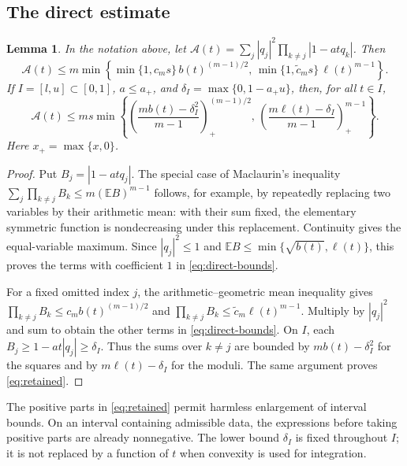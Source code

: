\documentclass[11pt,reqno]{amsart}
\newtheorem{lem}[thm]{Lemma}
\theoremstyle{definition}
\theoremstyle{remark}
\numberwithin{equation}{section}
\newcommand{\E}{\mathbb E}
\begin{document}
\subsection{The direct estimate}

\begin{lem}\label{lem:direct}
In the notation above, let
$\mathcal A(t)=\sum_j|q_j|^2\prod_{k\ne j}|1-atq_k|$.
Then
\begin{equation}\label{eq:direct-bounds}
 \mathcal A(t)\le m\min\left\{
 \min\{1,c_ms\}\,b(t)^{(m-1)/2},\,
 \min\{1,\widetilde c_ms\}\,\ell(t)^{m-1}
 \right\}.
\end{equation}
If $I=[l,u]\subset[0,1]$, $a\le a_+$, and $\delta_I=\max\{0,1-a_+u\}$, then, for all $t\in I$,
\begin{equation}\label{eq:retained}
 \mathcal A(t)\le ms\min\left\{
 \left(\frac{mb(t)-\delta_I^2}{m-1}\right)_{+}^{(m-1)/2},\,
 \left(\frac{m\ell(t)-\delta_I}{m-1}\right)_{+}^{m-1}
 \right\}.
\end{equation}
Here $x_+=\max\{x,0\}$.
\end{lem}
\begin{proof}
Put $B_j=|1-atq_j|$. The special case of Maclaurin's inequality
$\sum_j\prod_{k\ne j}B_k\le m(\E B)^{m-1}$ follows, for example, by repeatedly replacing two variables by their arithmetic mean: with their sum fixed, the elementary symmetric function is nondecreasing under this replacement. Continuity gives the equal-variable maximum. Since $|q_j|^2\le1$ and $\E B\le\min\{\sqrt{b(t)},\ell(t)\}$, this proves the terms with coefficient $1$ in \eqref{eq:direct-bounds}.

For a fixed omitted index $j$, the arithmetic--geometric mean inequality gives
$\prod_{k\ne j}B_k\le c_m b(t)^{(m-1)/2}$ and
$\prod_{k\ne j}B_k\le\widetilde c_m\ell(t)^{m-1}$.
Multiply by $|q_j|^2$ and sum to obtain the other terms in \eqref{eq:direct-bounds}.
On $I$, each $B_j\ge1-at|q_j|\ge\delta_I$. Thus the sums over $k\ne j$ are bounded by $mb(t)-\delta_I^2$ for the squares and by $m\ell(t)-\delta_I$ for the moduli. The same argument proves \eqref{eq:retained}.
\end{proof}

The positive parts in \eqref{eq:retained} permit harmless enlargement of interval bounds. On an interval containing admissible data, the expressions before taking positive parts are already nonnegative. The lower bound $\delta_I$ is fixed throughout $I$; it is not replaced by a function of $t$ when convexity is used for integration.
\end{document}
